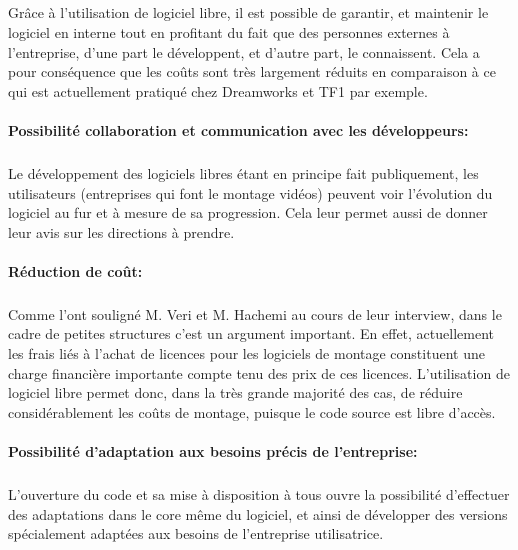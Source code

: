 \begin{itemize}
  \subparagraph{ }

    Grâce à l'utilisation de logiciel libre, il est possible de
    garantir, et maintenir le logiciel en interne tout en profitant
    du fait que des personnes externes à l'entreprise, d'une part
    le développent, et d'autre part, le connaissent. Cela a pour
    conséquence que les coûts sont très largement réduits en
    comparaison à ce qui est actuellement pratiqué chez Dreamworks et
    TF1 par  exemple.

\paragraph{Possibilité collaboration et communication avec les
développeurs:}

  \subparagraph{}

  Le développement des logiciels libres étant en principe fait
  publiquement, les utilisateurs (entreprises qui font le montage
  vidéos) peuvent voir l'évolution du logiciel au fur et à mesure
  de sa progression. Cela leur permet aussi de donner leur avis sur les
  directions à prendre.

\paragraph{Réduction de coût:}

\subparagraph{}

Comme l'ont souligné  M. Veri et M. Hachemi au cours de leur interview,
dans le cadre de petites structures c'est un argument important.
En effet,  actuellement les frais liés à l'achat de licences pour
les logiciels de montage constituent une charge financière importante
compte tenu des prix de ces licences. L'utilisation de logiciel libre
permet donc, dans la très grande majorité des cas, de réduire
considérablement les coûts de montage, puisque le code source est
libre d'accès.

\paragraph{Possibilité d'adaptation aux besoins précis de l'entreprise:}

\subparagraph{}

L'ouverture du code et sa mise à disposition à tous ouvre la
possibilité d'effectuer des adaptations dans le core même du logiciel,
et ainsi de développer des versions spécialement adaptées aux besoins
de l'entreprise utilisatrice.


\end{itemize}
